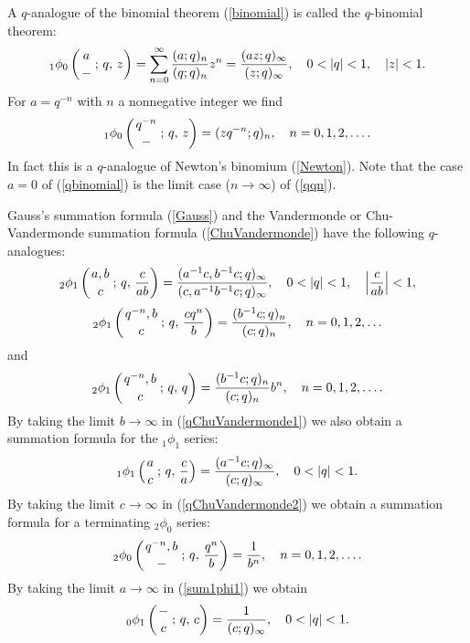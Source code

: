\documentclass[envcountchap,graybox]{svmono}
\newcommand{\qhyp}[5]{\mbox{}_{#1}{\phi}_{#2}
\left(\genfrac{}{}{0pt}{}{#3}{#4}\,;\,q,\,#5\right)}
\begin{document}
A $q$-analogue of the binomial theorem (\ref{binomial}) is called the $q$-binomial theorem:
\begin{equation}
\label{qbinomial}\index{q-Binomial theorem@$q$-Binomial theorem}
\index{Summation formula!q-Binomial theorem@$q$-Binomial theorem}
\qhyp{1}{0}{a}{-}{z}=\sum_{n=0}^{\infty}\frac{(a;q)_n}{(q;q)_n}z^n=
\frac{(az;q)_{\infty}}{(z;q)_{\infty}},\quad 0<|q|<1,\quad |z|<1.
\end{equation}
For $a=q^{-n}$ with $n$ a nonnegative integer we find
\begin{equation}
\label{qbinomialn}
\qhyp{1}{0}{q^{-n}}{-}{z}=(zq^{-n};q)_n,\quad n=0,1,2,\ldots.
\end{equation}
In fact this is a $q$-analogue of Newton's binomium (\ref{Newton}).
Note that the case $a=0$ of (\ref{qbinomial}) is the limit case ($n\rightarrow\infty$) of (\ref{qqn}).

Gauss's summation formula (\ref{Gauss}) and the Vandermonde or Chu-Vandermonde
summation formula (\ref{ChuVandermonde}) have the following $q$-analogues:
\begin{equation}
\label{qChuVandermonde1}\index{q-Gauss summation formula@$q$-Gauss summation formula}
\index{Summation formula!q-Gauss@$q$-Gauss}
\qhyp{2}{1}{a,b}{c}{\frac{c}{ab}}=\frac{(a^{-1}c,b^{-1}c;q)_{\infty}}
{(c,a^{-1}b^{-1}c;q)_{\infty}},\quad 0<|q|<1,\quad\left|\frac{c}{ab}\right|<1,
\end{equation}
\begin{equation}
\label{qChuVandermonde2}\index{q-Vandermonde summation formula@$q$-Vandermonde summation formula}
\index{Summation formula!q-Vandermonde@$q$-Vandermonde}
\index{q-Chu-Vandermonde summation formula@$q$-Chu-Vandermonde summation formula}
\index{Summation formula!q-Chu-Vandermonde@$q$-Chu-Vandermonde}
\qhyp{2}{1}{q^{-n},b}{c}{\frac{cq^n}{b}}=\frac{(b^{-1}c;q)_n}{(c;q)_n},\quad n=0,1,2,\ldots
\end{equation}
and
\begin{equation}
\label{qChuVandermonde3}
\qhyp{2}{1}{q^{-n},b}{c}{q}=\frac{(b^{-1}c;q)_n}{(c;q)_n}b^n,\quad n=0,1,2,\ldots.
\end{equation}
By taking the limit $b\rightarrow\infty$ in (\ref{qChuVandermonde1}) we also obtain a summation
formula for the ${}_1\phi_1$ series:
\begin{equation}
\label{sum1phi1}\index{Summation formula!for a ${}_1\phi_1$}
\qhyp{1}{1}{a}{c}{\frac{c}{a}}=\frac{(a^{-1}c;q)_{\infty}}{(c;q)_{\infty}},\quad 0<|q|<1.
\end{equation}
By taking the limit $c\rightarrow\infty$ in (\ref{qChuVandermonde2}) we obtain a summation
formula for a terminating ${}_2\phi_0$ series:
\begin{equation}
\label{sum2phi0}\index{Summation formula!for a terminating ${}_2\phi_0$}
\qhyp{2}{0}{q^{-n},b}{-}{\frac{q^n}{b}}=\frac{1}{b^n},\quad n=0,1,2,\ldots.
\end{equation}
By taking the limit $a\rightarrow\infty$ in (\ref{sum1phi1}) we obtain
\begin{equation}
\label{sum0phi1}\index{Summation formula!for a ${}_0\phi_1$}
\qhyp{0}{1}{-}{c}{c}=\frac{1}{(c;q)_{\infty}},\quad 0<|q|<1.
\end{equation}
\end{document}
